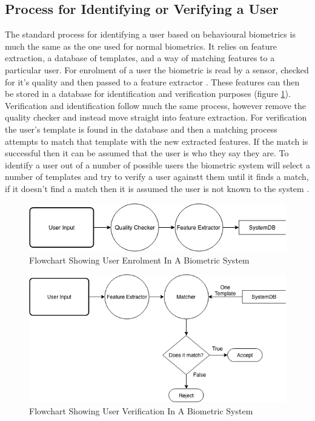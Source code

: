 \documentclass[12pt]{article}
\begin{document}
	\subsection{Process for Identifying or Verifying a User}
	
	The standard process for identifying a user based on behavioural biometrics is much the same as the one used for normal biometrics. It relies on feature extraction, a database of templates, and a way of matching features to a particular user. For enrolment of a user the biometric is read by a sensor, checked for it's quality and then passed to a feature extractor \citep{jain2004introduction}. These features can then be stored in a database for identification and verification purposes (figure \ref{fig:flowchat:enrolment}). Verification and identification follow much the same process, however remove the quality checker and instead move straight into feature extraction. For verification the user's template is found in the database and then a matching process attempts to match that template with the new extracted features. If the match is successful then it can be assumed that the user is who they say they are. To identify a user out of a number of possible users the biometric system will select a number of templates and try to verify a user againstt them until it finds a match, if it doesn't find a match then it is assumed the user is not known to the system \citep{jain2004introduction}.
	
	\begin{figure}[H]
	    \centering
	    \includegraphics[width=\textwidth]{biometric_flowcharts-Enrolment.png}
	    \caption{Flowchart Showing User Enrolment In A Biometric System \citep{jain2004introduction}}
	    \label{fig:flowchat:enrolment}
	\end{figure}
	
		\begin{figure}[H]
	    \centering
	    \includegraphics[width=\textwidth]{biometric_flowcharts-Verification.png}
	    \caption{Flowchart Showing User Verification In A Biometric System \citep{jain2004introduction}}
	    \label{fig:flowchat:verification}
	\end{figure}
	
\end{document}
